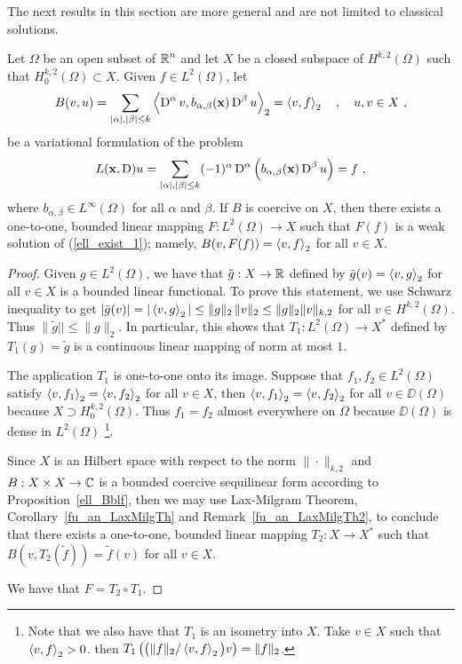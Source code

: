 The next results in this section are more general and are not limited to
classical solutions.

\begin{theorem} \label{ell_exist_th1}
Let $\Omega$ be an open subset of $\displaystyle \mathbb{R}^n$ and let $X$ be a closed
subspace of $\displaystyle H^{k,2}(\Omega)$ such that
$\displaystyle H^{k,2}_0(\Omega) \subset X$.
Given $\displaystyle f \in L^2(\Omega)$, let
\begin{equation} \label{ell_exist_1}
B(v,u) = \sum_{|\alpha|,|\beta|\leq k}
\left\langle{\operatorname{D}^\alpha v} , {b_{\alpha,\beta}(\mathbf{x}) \operatorname{D}^\beta u}\right\rangle_2
= \left\langle{v} , {f}\right\rangle_2 \quad , \quad u,v \in X \ ,
\end{equation}
be a variational formulation of the problem
\begin{equation} \label{ell_exist_2}
L(\mathbf{x},\operatorname{D})u = \sum_{|\alpha|,|\beta|\leq k} (-1)^\alpha \operatorname{D}^\alpha
\left( b_{\alpha,\beta}(\mathbf{x}) \operatorname{D}^\beta u\right) = f \  ,
\end{equation}
where $\displaystyle b_{\alpha,\beta} \in L^\infty(\Omega)$ for all
$\alpha$ and $\beta$.
If $B$ is coercive on $X$, then there exists a one-to-one, bounded
linear mapping $F:L^2(\Omega) \rightarrow X$ such that $F(f)$ is a
weak solution of (\ref{ell_exist_1}); namely,
$\displaystyle B(v,F(f)) = \left\langle{v} , {f}\right\rangle_2$ for all $\displaystyle v \in X$.
\end{theorem}

\begin{proof}
Given $\displaystyle g \in L^2(\Omega)$, we have that
$\tilde{g}:X \to \mathbb{R}$ defined by
$\tilde{g}(v) = \left\langle{v} , {g}\right\rangle_2$ for all $v \in X$ is a bounded linear
functional.  To prove this statement, we use Schwarz inequality to get
$\displaystyle |\tilde{g}(v)| =|\left\langle{v} , {g}\right\rangle_2|
\leq \|g\|_2 \, \|v\|_2 \leq \|g\|_2 \|v\|_{k,2}$
for all $\displaystyle v \in H^{k,2}(\Omega)$.  Thus 
$\|\tilde{g}|| \leq \|g\|_2$.  In particular, this shows that
$\displaystyle T_1:L^2(\Omega) \to X^\ast$ defined by
$T_1(g) = \tilde{g}$ is a continuous linear mapping of norm at most $1$. 

The application $T_1$ is one-to-one onto its image.  Suppose that
$\displaystyle f_1, f_2 \in L^2(\Omega)$ satisfy
$\left\langle{v} , {f_1}\right\rangle_2 = \left\langle{v} , {f_2}\right\rangle_2$ for all $v\in X$, then 
$\left\langle{v} , {f_1}\right\rangle_2 = \left\langle{v} , {f_2}\right\rangle_2$ for all $v\in \DD(\Omega)$ because
$\displaystyle X\supset H^{k,2}_0(\Omega)$.  Thus $f_1=f_2$ almost
everywhere on $\Omega$ because $\DD(\Omega)$ is dense in
$L^2(\Omega)$ \footnote{Note that we also have that $T_1$ is an
isometry into $X$.  Take $v \in X$ such that $\left\langle{v} , {f}\right\rangle_2>0$. then
$\displaystyle T_1\left(\big(\|f\|_2 / \left\langle{v} , {f}\right\rangle_2\big) v\right) = \|f\|_2$.}.

Since $X$ is an Hilbert space with respect to the norm
$\|\cdot\|_{k,2}$ and $B:X\times X \rightarrow \mathbb{C}$ is a bounded
coercive sequilinear form according to Proposition~\ref{ell_Bblf}, then we may
use Lax-Milgram Theorem, Corollary~\ref{fu_an_LaxMilgTh}
and Remark~\ref{fu_an_LaxMilgTh2}, to conclude that there exists a
one-to-one, bounded linear mapping $T_2:X \rightarrow X^\ast$ such that
$\displaystyle B(v,T_2(\tilde{f})) = \tilde{f}(v)$ for all $v \in X$.

We have that $F = T_2 \circ T_1$.
\end{proof}

